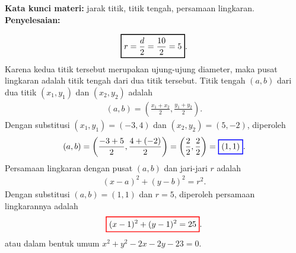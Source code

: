 \documentclass[10pt,openany,a4paper]{article}
\theoremstyle{definition}
\theoremstyle{definition}
\theoremstyle{plain}
\newenvironment{jawab}[2][tes]{%
\par\noindent\textbf{Kata kunci materi:} #1.\\
\textbf{Penyelesaian:} #2%
}{}
\begin{document}
\begin{enumerate}
\begin{jawab}[jarak titik, titik tengah, persamaan lingkaran]
{\begin{enumerate}
\begin{align*}
        \setlength{\fboxrule}{1pt} \boxed{\color{oldcolor}r = \frac{d}{2} = \frac{10}{2} = 5}\color{oldcolor}.
            \end{align*}
            Karena kedua titik tersebut merupakan ujung-ujung diameter, maka pusat lingkaran adalah titik tengah dari dua titik tersebut. Titik tengah $(a,b)$ dari dua titik $(x_1,y_1)$ dan $(x_2,y_2)$ adalah
            \begin{align*}
                (a,b) = \left(\frac{x_1+x_2}{2},\frac{y_1+y_2}{2}\right).
            \end{align*}
            Dengan substitusi $(x_1,y_1)=(-3,4)$ dan $(x_2,y_2)=(5,-2)$, diperoleh
            \begin{align*}
                (a,b) = \left(\frac{-3+5}{2}, \frac{4+(-2)}{2}\right) = \left(\frac{2}{2}, \frac{2}{2}\right) = \colorlet{oldcolor}{.}
        \color{blue}
        \setlength{\fboxrule}{1pt} \boxed{\color{oldcolor}(1,1)}\color{oldcolor}.
            \end{align*}
            Persamaan lingkaran dengan pusat $(a,b)$ dan jari-jari $r$ adalah
            \begin{align*}
                (x-a)^2 + (y-b)^2 = r^2.
            \end{align*}
            Dengan substitusi $(a,b)=(1,1)$ dan $r=5$, diperoleh persamaan lingkarannya adalah
            $$\colorlet{oldcolor}{.}
        \color{red}
        \setlength{\fboxrule}{1pt} \boxed{\color{oldcolor}(x-1)^2 + (y-1)^2 = 25}\color{oldcolor}.$$
            atau dalam bentuk umum $x^2+y^2-2x-2y-23=0$.
        \end{enumerate}
    }
    \end{jawab}


\end{enumerate}
\end{document}
